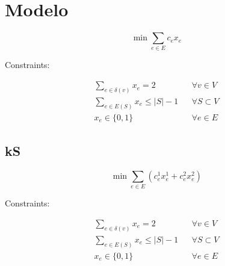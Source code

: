 \section{Modelo}

    \[
        \min \sum_{e \in E} c_e x_e
    \]

    Constraints:

    \begin{align*}
        \sum_{e \in \delta(v)} x_e = 2
            && \forall v \in V \\
        \sum_{e \in E(S)} x_e \leq |S| - 1
            && \forall S \subset V \\
        x_e \in \{0, 1\}
            && \forall e \in E
    \end{align*}

    \subsection{kS}

        \[
            \min \sum_{e \in E} \left(c_e^1 x_e^1 + c_e^2 x_e^2\right)
        \]

        Constraints:

        \begin{align*}
            \sum_{e \in \delta(v)} x_e = 2
                && \forall v \in V \\
            \sum_{e \in E(S)} x_e \leq |S| - 1
                && \forall S \subset V \\
            x_e \in \{0, 1\}
                && \forall e \in E
        \end{align*}

